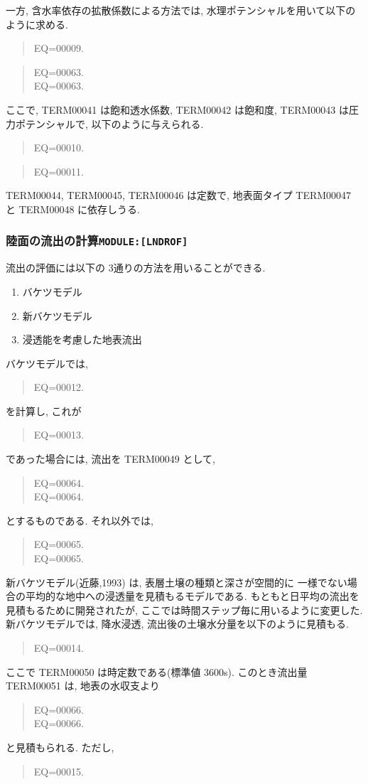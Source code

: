 一方, 含水率依存の拡散係数による方法では, 
水理ポテンシャルを用いて以下のように求める.
\begin{quote}
EQ=00009.
\end{quote}
\begin{quote}
EQ=00063.\\
EQ=00063.
\end{quote}
ここで, TERM00041 は飽和透水係数, TERM00042 は飽和度, TERM00043 は圧力ポテンシャルで, 
以下のように与えられる. 
\begin{quote}
EQ=00010.
\end{quote}
\begin{quote}
EQ=00011.
\end{quote}
TERM00044, TERM00045, TERM00046 は定数で, 地表面タイプ TERM00047 と TERM00048 に依存しうる. 

\subsubsection{陸面の流出の計算\texttt{MODULE:[LNDROF]}}

流出の評価には以下の 3通りの方法を用いることができる. 
\begin{enumerate}
\item バケツモデル
\item 新バケツモデル
\item 浸透能を考慮した地表流出
\end{enumerate}

バケツモデルでは,
\begin{quote}
EQ=00012.
\end{quote}
を計算し, これが
\begin{quote}
EQ=00013.
\end{quote}
であった場合には, 流出を TERM00049 として,
\begin{quote}
EQ=00064.\\
EQ=00064.
\end{quote}
とするものである.
それ以外では, 
\begin{quote}
EQ=00065.\\
EQ=00065.
\end{quote}

新バケツモデル(近藤,1993) は, 表層土壌の種類と深さが空間的に
一様でない場合の平均的な地中への浸透量を見積もるモデルである. 
もともと日平均の流出を見積もるために開発されたが, 
ここでは時間ステップ毎に用いるように変更した. 
%
新バケツモデルでは, 降水浸透, 流出後の土壌水分量を以下のように見積もる. 
\begin{quote}
EQ=00014.
\end{quote}
ここで TERM00050 は時定数である(標準値 3600s). 
%
このとき流出量 TERM00051 は, 地表の水収支より
\begin{quote}
EQ=00066.\\
EQ=00066.
\end{quote}
と見積もられる. 
ただし,
\begin{quote}
EQ=00015.
\end{quote}


